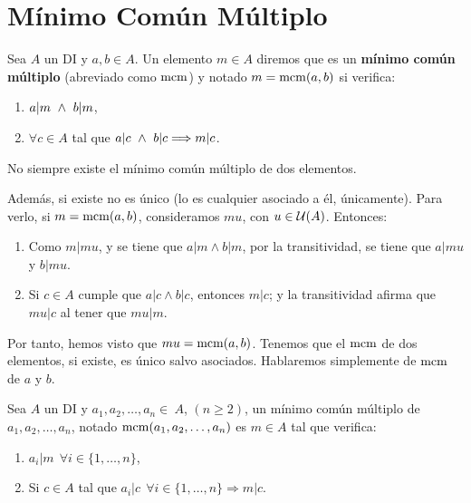 \section{Mínimo Común Múltiplo}
\begin{definicion}
    Sea $A$ un DI y $a, b \in A$. Un elemento $m \in A$ diremos que es un \textbf{mínimo común múltiplo} (abreviado como $\operatorname{mcm}$) y notado $m = \operatorname{mcm}(a,b)$ si verifica:
    \begin{enumerate}
        \item $a|m \ \land \  b|m$,
        \item $\forall c \in A$ tal que $a|c \ \land \  b|c \Longrightarrow m|c$.
    \end{enumerate}
\end{definicion}

\begin{observacion}
    No siempre existe el mínimo común múltiplo de dos elementos.
    
    Además, si existe no es único (lo es cualquier asociado a él, únicamente). Para verlo, si $m = \operatorname{mcm}(a,b)$, consideramos $mu$, con $u\in \mathcal{U}(A)$. Entonces:
    \begin{enumerate}
        \item Como $m|mu$, y se tiene que $a|m\land b|m$, por la transitividad, se tiene que $a|mu$ y $b|mu$.
        \item Si $c\in A$ cumple que $a|c\land b|c$, entonces $m|c$; y la transitividad afirma que $mu|c$ al tener que $mu|m$.
    \end{enumerate}
\end{observacion}
Por tanto, hemos visto que $mu=\operatorname{mcm}(a,b)$. Tenemos que el $\operatorname{mcm}$ de dos elementos, si existe, es único salvo asociados. Hablaremos simplemente de $\operatorname{mcm}$ de $a$ y $b$.

\begin{definicion}
    Sea $A$ un DI y $a_1, a_2, \ldots, a_n \in~A$, $(n\geq 2)$, un mínimo común múltiplo de $a_1, a_2, \ldots, a_n$, notado
    $\operatorname{mcm}(a_1, a_2, \ldots, a_n)$ es $m \in A$ tal que verifica:
    \begin{enumerate}
        \item $a_i|m~~\forall i \in \{1, \ldots, n\}$,
        \item Si $c\in A$ tal que $a_i|c~~\forall i \in \{1, \ldots, n\} \Longrightarrow m|c$.    \end{enumerate}
\end{definicion}

